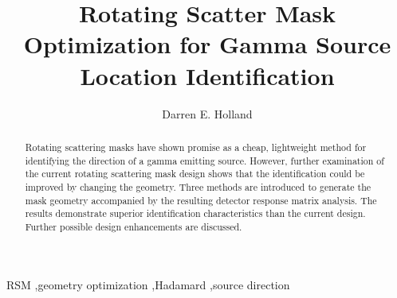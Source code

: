 \documentclass[3p,times]{elsarticle}
\begin{document}
\begin{frontmatter}



\dochead{}

\title{Rotating Scatter Mask Optimization for Gamma Source Location Identification}


\author[d1]{Darren E. Holland}

\address[d1]{dholland@cedarville.edu\\
  Department of Mechanical Engineering\\
	Cedarville University \\
	Cedarville, OH 45502 USA\\}

\begin{abstract}
Rotating scattering masks have shown promise as a cheap, lightweight method for identifying the direction of a gamma emitting source.
However, further examination of the current rotating scattering mask design shows that the identification could be improved by changing the geometry.  
Three methods are introduced to generate the mask geometry accompanied by the resulting detector response matrix analysis.  
The results demonstrate superior identification characteristics than the current design.  
Further possible design enhancements are discussed.
\end{abstract}

\begin{keyword}
RSM \sep geometry optimization \sep Hadamard \sep source direction

\end{keyword}

\end{frontmatter}
\end{document}
